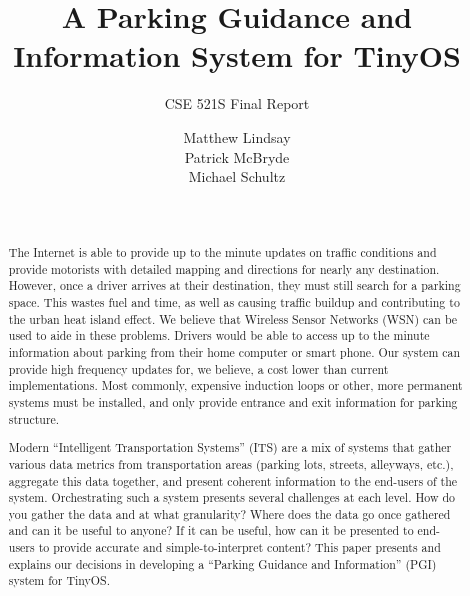 \documentclass{acm_proc}
\begin{document}
\title{A Parking Guidance and Information System for TinyOS}
\subtitle{CSE 521S Final Report}

\author{
\alignauthor Matthew Lindsay\\
\alignauthor Patrick McBryde\\
\alignauthor Michael Schultz\\
\and
{}\\
}

\maketitle

\begin{abstract}
The Internet is able to provide up to the minute updates on traffic
conditions and provide motorists with detailed mapping and directions for
nearly any destination.
However, once a driver arrives at their destination, they must still
search for a parking space.
This wastes fuel and time, as well as causing traffic buildup and
contributing to the urban heat island effect.
We believe that Wireless Sensor Networks (WSN) can be used to aide in these
problems.
Drivers would be able to access up to the minute information about parking
from their home computer or smart phone.
Our system can provide high frequency updates for, we believe, a cost lower
than current implementations.
Most commonly, expensive induction loops or other, more permanent systems
must be installed, and only provide entrance and exit information for
parking structure.

Modern ``Intelligent Transportation Systems'' (ITS) are a mix of systems
that gather various data metrics from transportation areas (parking lots,
streets, alleyways, etc.), aggregate this data together, and present
coherent information to the end-users of the system.
Orchestrating such a system presents several challenges at each level.
How do you gather the data and at what granularity?
Where does the data go once gathered and can it be useful to anyone?
If it can be useful, how can it be presented to end-users to provide
accurate and simple-to-interpret content?
This paper presents and explains our decisions in developing a ``Parking
Guidance and Information'' (PGI) system for TinyOS.
\end{abstract}
\end{document}
